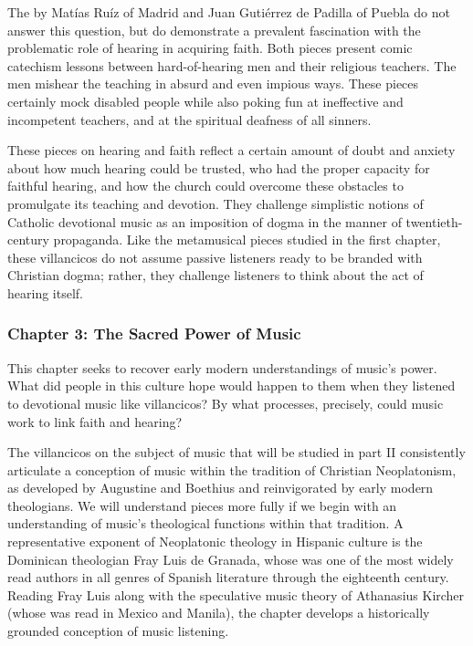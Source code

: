 \documentclass[tt]{vcbook-proposal}
\begin{document}
The  by Matías Ruíz of Madrid and Juan Gutiérrez de Padilla of Puebla do not answer this question, but do demonstrate a prevalent fascination with the problematic role of hearing in acquiring faith.
Both pieces present comic catechism lessons between hard-of-hearing men and their religious teachers.
The  men mishear the teaching in absurd and even impious ways.
These pieces certainly mock disabled people while also poking fun at ineffective and incompetent teachers, and at the spiritual deafness of all sinners.

These pieces on hearing and faith reflect a certain amount of doubt and anxiety about how much hearing could be trusted, who had the proper capacity for faithful hearing, and how the church could overcome these obstacles to promulgate its teaching and devotion.
They challenge simplistic notions of Catholic devotional music as an imposition of dogma in the manner of twentieth-century propaganda. 
Like the metamusical pieces studied in the first chapter, these villancicos do not assume passive listeners ready to be branded with Christian dogma; rather, they challenge listeners to think about the act of hearing itself.


\subsubsection{Chapter 3: The Sacred Power of Music}

This chapter seeks to recover early modern understandings of music's power.
What did people in this culture hope would happen to them when they listened to devotional music like villancicos?
By what processes, precisely, could music work to link faith and hearing?

The villancicos on the subject of music that will be studied in part II consistently articulate a conception of music within the tradition of Christian Neoplatonism, as developed by Augustine and Boethius and reinvigorated by early modern theologians.
We will understand pieces more fully if we begin with an understanding of music's theological functions within that tradition.
A representative exponent of Neoplatonic theology in Hispanic culture is the Dominican theologian Fray Luis de Granada, whose was one of the most widely read authors in all genres of Spanish literature through the eighteenth century.
Reading Fray Luis along with the speculative music theory of Athanasius Kircher (whose  was read in Mexico and Manila), the chapter develops a historically grounded conception of music listening.
\end{document}
